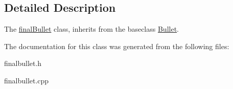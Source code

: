 \subsection{Detailed Description}
The \hyperlink{classfinalBullet}{final\+Bullet} class, inherits from the baseclass \hyperlink{classBullet}{Bullet}. 

The documentation for this class was generated from the following files\+:\begin{DoxyCompactItemize}
\item 
finalbullet.\+h\item 
finalbullet.\+cpp\end{DoxyCompactItemize}
